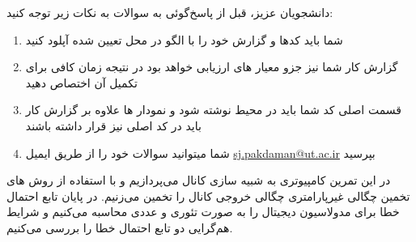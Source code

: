 \documentclass[14pt, professionalfont]{article}
\begin{document}
	{ \Large
		
		دانشجویان عزیز، قبل از پاسخ‌گوئی به سوالات به نکات زیر توجه کنید:
		\begin{enumerate}
			\item 
			شما باید کدها و گزارش خود را با الگو
			\:
			\:
			در محل تعیین شده آپلود کنید
			\item 
			گزارش کار شما نیز جزو معیار های ارزیابی خواهد بود در نتیجه زمان کافی	 برای تکمیل آن اختصاص دهید
			\item 
			
			قسمت اصلی کد شما باید در محیط 
			\:
			\:
			نوشته شود و نمودار ها علاوه‌ بر گزارش کار باید در کد اصلی نیز قرار داشته باشند

			\item 
			شما میتوانید سوالات خود را از طریق ایمیل
			\textcolor{blue}{
				\: 
				\href{mailto:sj.pakdaman@ut.ac.ir}{sj.pakdaman@ut.ac.ir}
				\:}
			بپرسید
		\end{enumerate}
	}
	
	\thispagestyle{empty}
	\clearpage
	\pagebreak
	در این تمرین کامپیوتری به شبیه سازی کانال 
	\:
	\:
	می‌پردازیم و با استفاده از روش های تخمین چگالی غیر‌پارامتری چگالی خروجی کانال را تخمین می‌زنیم. در پایان تابع احتمال خطا برای مدولاسیون دیجیتال 
	\:
	\:
	را به صورت تئوری و عددی محاسبه می‌کنیم و شرایط هم‌گرایی دو تابع احتمال خطا را بررسی می‌کنیم.
	
\end{document}
